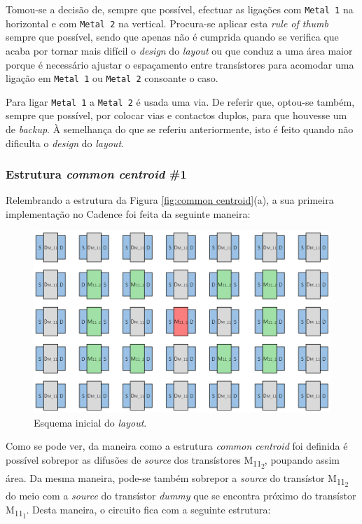 \documentclass[11pt]{article}
\numberwithin{equation}{section}
\begin{document}
Tomou-se a decisão de, sempre que possível, efectuar as ligações com \texttt{Metal 1} na horizontal e com \texttt{Metal 2} na vertical. Procura-se aplicar esta \textit{rule of thumb} sempre que possível, sendo que apenas não é cumprida quando se verifica que acaba por tornar mais difícil o \textit{design} do \textit{layout} ou que conduz a uma área maior porque é necessário ajustar o espaçamento entre transístores para acomodar uma ligação em \texttt{Metal 1} ou \texttt{Metal 2} consoante o caso.

Para ligar \texttt{Metal 1} a \texttt{Metal 2} é usada uma via. De referir que, optou-se também, sempre que possível, por colocar vias e contactos duplos, para que houvesse um de \textit{backup}. À semelhança do que se referiu anteriormente, isto é feito quando não dificulta o \textit{design} do \textit{layout}.

\subsubsection{Estrutura \textit{common centroid} \#1}

Relembrando a estrutura da Figura \ref{fig:common centroid}(a), a sua primeira implementação no Cadence foi feita da seguinte maneira:

\begin{figure}[H]
	\centering
	\includegraphics[keepaspectratio=true, scale=0.30]{teoricas/layout/cc1_1}
	\vspace{-0.5em}
	\caption{Esquema inicial do \textit{layout}.}
	\vspace{-0.8em} 
\end{figure}

Como se pode ver, da maneira como a estrutura \textit{common centroid} foi definida é possível sobrepor as difusões de \textit{source} dos transístores M\textsubscript{11\textsubscript{2}}, poupando assim área. Da mesma maneira, pode-se também sobrepor a \textit{source} do transístor M\textsubscript{11\textsubscript{2}} do meio com a \textit{source} do transístor \textit{dummy} que se encontra próximo do transístor M\textsubscript{11\textsubscript{1}}. Desta maneira, o circuito fica com a seguinte estrutura:
\end{document}
